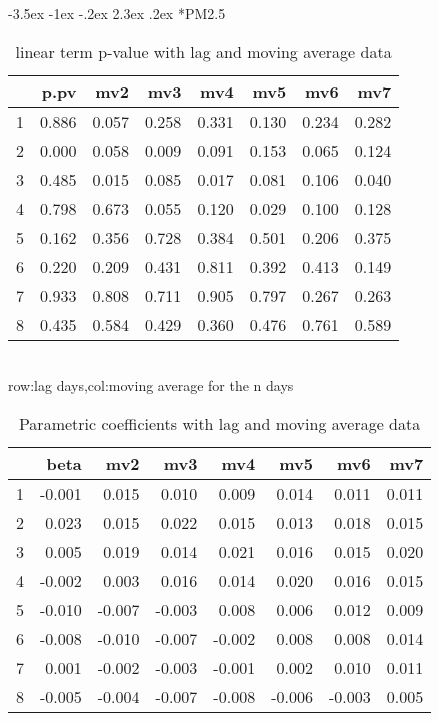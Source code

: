 \documentclass[a4paper, 12pt]{article}
\makeatletter
\def\large{\fontsize{14}{20}\selectfont}
\renewcommand\subsection{\@startsection {subsection}{1}{\z@}%
                                   {-3.5ex \@plus -1ex \@minus -.2ex}%
                                   {2.3ex \@plus.2ex}%
                                   {\centering\normalfont\large\bfseries}}
\makeatother
\begin{document}
\subsection*{PM2.5}
\begin{table}[h]
\centering
\caption{linear term p-value with lag and moving average data}
\begin{tabular}{rrrrrrrr}
  \hline
 & p.pv & mv2 & mv3 & mv4 & mv5 & mv6 & mv7 \\
  \hline
1 & 0.886 & 0.057 & 0.258 & 0.331 & 0.130 & 0.234 & 0.282 \\
  2 & 0.000 & 0.058 & 0.009 & 0.091 & 0.153 & 0.065 & 0.124 \\
  3 & 0.485 & 0.015 & 0.085 & 0.017 & 0.081 & 0.106 & 0.040 \\
  4 & 0.798 & 0.673 & 0.055 & 0.120 & 0.029 & 0.100 & 0.128 \\
  5 & 0.162 & 0.356 & 0.728 & 0.384 & 0.501 & 0.206 & 0.375 \\
  6 & 0.220 & 0.209 & 0.431 & 0.811 & 0.392 & 0.413 & 0.149 \\
  7 & 0.933 & 0.808 & 0.711 & 0.905 & 0.797 & 0.267 & 0.263 \\
  8 & 0.435 & 0.584 & 0.429 & 0.360 & 0.476 & 0.761 & 0.589 \\
   \hline
\end{tabular}
\\row:lag days,col:moving average for the n days
\end{table}

\begin{table}[h]
\centering
\caption{Parametric coefficients with lag and moving average data}
\begin{tabular}{rrrrrrrr}
  \hline
 & beta & mv2 & mv3 & mv4 & mv5 & mv6 & mv7 \\
  \hline
1 & -0.001 & 0.015 & 0.010 & 0.009 & 0.014 & 0.011 & 0.011 \\
  2 & 0.023 & 0.015 & 0.022 & 0.015 & 0.013 & 0.018 & 0.015 \\
  3 & 0.005 & 0.019 & 0.014 & 0.021 & 0.016 & 0.015 & 0.020 \\
  4 & -0.002 & 0.003 & 0.016 & 0.014 & 0.020 & 0.016 & 0.015 \\
  5 & -0.010 & -0.007 & -0.003 & 0.008 & 0.006 & 0.012 & 0.009 \\
  6 & -0.008 & -0.010 & -0.007 & -0.002 & 0.008 & 0.008 & 0.014 \\
  7 & 0.001 & -0.002 & -0.003 & -0.001 & 0.002 & 0.010 & 0.011 \\
  8 & -0.005 & -0.004 & -0.007 & -0.008 & -0.006 & -0.003 & 0.005 \\
   \hline
\end{tabular}
\end{table}
\clearpage
\end{document}
